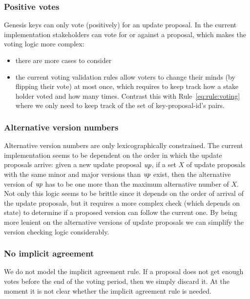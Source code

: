 \subsubsection{Positive votes}
\label{sec:only-positive-votes}

Genesis keys can only vote (positively) for an update proposal. In the current
implementation stakeholders can vote for or against a proposal, which makes the
voting logic more complex:
\begin{itemize}
\item there are more cases to consider
\item the current voting validation rules allow voters to change their minds
  (by flipping their vote) at most once, which requires to keep track how a
  stake holder voted and how many times. Contrast this with
  Rule~\ref{eq:rule:voting} where we only need to keep track of the set of
  key-proposal-id's pairs.
\end{itemize}

\subsubsection{Alternative version numbers}
\label{sec:alt-version-numbers-constraints}

Alternative version numbers are only lexicographically constrained. The current
implementation seems to be dependent on the order in which the update proposals
arrive: given a new update proposal $\mathit{up}$, if a set $X$ of update
proposals with the same minor and major versions than $\mathit{up}$ exist, then
the alternative version of $\mathit{up}$ has to be one more than the maximum
alternative number of $X$. Not only this logic seems to be brittle since it
depends on the order of arrival of the update proposals, but it requires a more
complex check (which depends on state) to determine if a proposed version can
follow the current one. By being more lenient on the alternative versions of
update proposals we can simplify the version checking logic considerably.

\subsubsection{No implicit agreement}
\label{sec:no-implicit-agreement}

We do not model the implicit agreement rule. If a proposal does not get enough
votes before the end of the voting period, then we simply discard it. At the
moment it is not clear whether the implicit agreement rule is needed.

